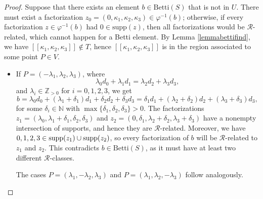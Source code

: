 \documentclass[12pt]{article}
\theoremstyle{remark}
\begin{document}
\begin{proof}
    Suppose that there exists an element $b \in \text{Betti}(S)$ that is not in $U$.
    There must exist a factorization $z_0 =(0,\kappa_1,\kappa_2,\kappa_3) \in \varphi^{-1}(b)$; otherwise, if every factorization $z \in \varphi^{-1}(b)$ had $0 \in \text{supp}(z)$, then all factorizations would be $\mathcal{R}$-related, which cannot happen for a Betti element. By Lemma \ref{lemmabettifind}, we have $[[\kappa_1,\kappa_2,\kappa_3]] \notin T$, hence $[[\kappa_1,\kappa_2,\kappa_3]]$ is in the region associated to some point $P \in V$.

    \begin{itemize}

    

    \item  If $P =(-\lambda_1,\lambda_2,\lambda_3)$, where
    \begin{equation}\label{betticharacter_eq1}
        \lambda_0d_0 + \lambda_1d_1 = \lambda_2d_2 + \lambda_3d_3,
    \end{equation}
    and $\lambda_i \in \mathbb{Z}_{>0}$ for $i =0,1,2,3$, we get
     \begin{equation}\label{betticharacter_eq10}
        b =\lambda_0d_0 + (\lambda_1+\delta_1)d_1 + \delta_2d_2 + \delta_3d_3  =  \delta_1d_1 + (\lambda_2+\delta_2)d_2 + (\lambda_3+\delta_3)d_3,
    \end{equation}
    for some $\delta_i \in \mathbb{N}$ with $\max \{\delta_1,\delta_2,\delta_3\} > 0$. The factorizations $z_1 =(\lambda_0,\lambda_1+\delta_1,\delta_2,\delta_3)$ and $z_2 =(0, \delta_1,\lambda_2+\delta_2,\lambda_3+\delta_3)$ have a nonempty intersection of supports, and hence they are $\mathcal{R}$-related. Moreover, we have $0,1,2,3 \in \textup{supp}(z_1) \cup \textup{supp}(z_2)$, so every factorization of $b$ will be $\mathcal{R}$-related to $z_1$ and $z_2$. This contradicts $b \in \text{Betti}(S)$, as it must have at least two different $\mathcal{R}$-classes. 
    
    The cases $P=(\lambda_1,-\lambda_2,\lambda_3)$ and $P=(\lambda_1,\lambda_2,-\lambda_3)$ follow analogously.
    

\end{itemize}
\end{proof}
\end{document}
